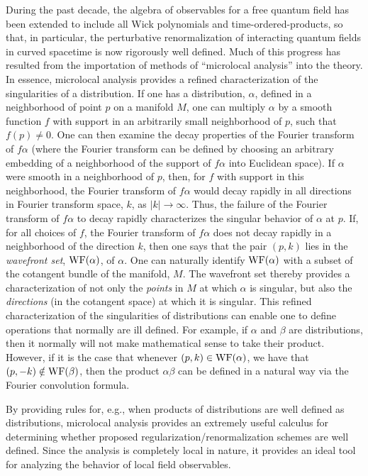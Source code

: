 \documentclass[12pt,epsf,amsfonts,amssymb]{article}
\begin{document}
During the past decade, the algebra of observables for a free quantum
field has been extended to include all Wick polynomials and
time-ordered-products, so that, in particular, the perturbative
renormalization of interacting quantum fields in curved spacetime is
now rigorously well defined. Much of this progress has resulted from
the importation of methods of ``microlocal analysis'' into the
theory. In essence, microlocal analysis provides a refined
characterization of the singularities of a distribution. If one has a
distribution, $\alpha$, defined in a neighborhood of point $p$ on a
manifold $M$, one can multiply $\alpha$ by a smooth function $f$ with
support in an arbitrarily small neighborhood of $p$, such that $f(p)
\neq 0$. One can then examine the decay properties of the Fourier
transform of $f \alpha$ (where the Fourier transform can be defined by
choosing an arbitrary embedding of a neighborhood of the support of $f
\alpha$ into Euclidean space). If $\alpha$ were smooth in a
neighborhood of $p$, then, for $f$ with support in this neighborhood,
the Fourier transform of $f \alpha$ would decay rapidly in all
directions in Fourier transform space, $k$, as $|k| \rightarrow
\infty$. Thus, the failure of the Fourier transform of $f \alpha$ to
decay rapidly characterizes the singular behavior of $\alpha$ at
$p$. If, for all choices of $f$, the Fourier transform of $f \alpha$
does not decay rapidly in a neighborhood of the direction $k$, then
one says that the pair $(p,k)$ lies in the {\it wavefront set}, ${\rm
WF}(\alpha)$, of $\alpha$. One can naturally identify ${\rm
WF}(\alpha)$ with a subset of the cotangent bundle of the manifold,
$M$. The wavefront set thereby provides a characterization of not only
the {\it points} in $M$ at which $\alpha$ is singular, but also the
{\it directions} (in the cotangent space) at which it is
singular. This refined characterization of the singularities of
distributions can enable one to define operations that normally are
ill defined. For example, if $\alpha$ and $\beta$ are distributions,
then it normally will not make mathematical sense to take their
product. However, if it is the case that whenever $(p,k) \in {\rm
WF}(\alpha)$, we have that $(p,-k) \notin {\rm WF}(\beta)$, then the
product $\alpha \beta$ can be defined in a natural way via the Fourier
convolution formula.

By providing rules for, e.g., when products of distributions are well
defined as distributions, microlocal analysis provides an extremely
useful calculus for determining whether proposed
regularization/renormalization schemes are well defined. Since the
analysis is completely local in nature, it provides an ideal tool for
analyzing the behavior of local field observables.
\end{document}
